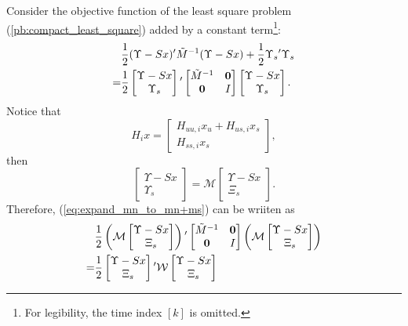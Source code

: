 \documentclass[12pt]{article}
\newcommand{\Mc}{{\mathcal{M}}}
\newcommand{\Wc}{{\mathcal{W}}}
\begin{document}
Consider the objective function of the least square problem (\ref{pb:compact_least_square}) added by a constant term\footnote{For legibility, the time index $[k]$ is omitted.}:
\begin{align}
	&\frac{1}{2} (\Upsilon - Sx ){'} \tilde{M}^{-1} (\Upsilon - Sx ) +\frac{1}{2}  \Upsilon_s{'} \Upsilon_s \notag \\
	=&\frac{1}{2}\begin{bmatrix}
		\Upsilon - Sx \\ \Upsilon_s
	\end{bmatrix}{'}
	\begin{bmatrix}
		\tilde{M}^{-1} & \mathbf{0} \\
		\mathbf{0} &  I
	\end{bmatrix}
	\begin{bmatrix}
		\Upsilon - Sx \\ \Upsilon_s
	\end{bmatrix}. \label{eq:expand_mn_to_mn+ms}
\end{align}
Notice that 
\begin{equation*}
	H_i x =\begin{bmatrix}
		H_{uu,i} x_u + H_{us,i} x_s \\
		H_{ss,i} x_s
	\end{bmatrix},
\end{equation*}
then 
\begin{equation*}
	\begin{bmatrix}
		\Upsilon - Sx \\
		\Upsilon_s
	\end{bmatrix}=\Mc
	\begin{bmatrix}
		\Upsilon - Sx \\
		\Xi_s
	\end{bmatrix}.
\end{equation*}
Therefore, (\ref{eq:expand_mn_to_mn+ms}) can be wriiten as 
\begin{align}
	&\frac{1}{2}
	\left(\Mc
	\begin{bmatrix}
		\Upsilon - Sx \\
		\Xi_s
	\end{bmatrix}
	\right){'}
	\begin{bmatrix}
		\tilde{M}^{-1} & \mathbf{0} \\
		\mathbf{0} &  I
	\end{bmatrix}
	\left(\Mc
	\begin{bmatrix}
		\Upsilon - Sx \\
		\Xi_s
	\end{bmatrix}
	\right) \notag
	\\
	=&\frac{1}{2}
	\begin{bmatrix}
		\Upsilon - Sx \\
		\Xi_s
	\end{bmatrix}{'}
	\Wc
	\begin{bmatrix}
		\Upsilon - Sx \\
		\Xi_s
	\end{bmatrix} \label{eq:obj_function}
\end{align}
\end{document}
